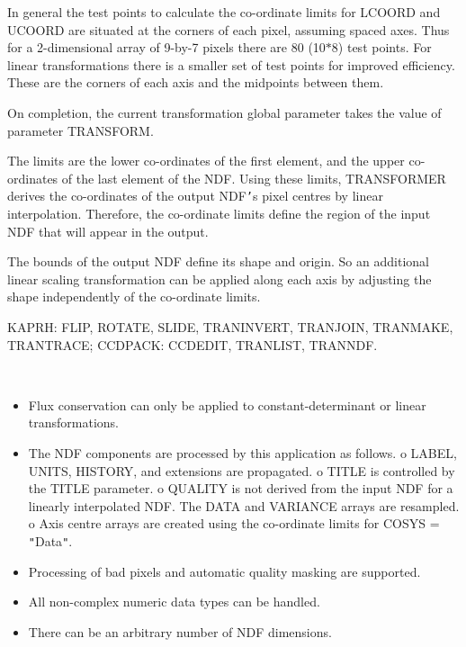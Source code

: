 \documentclass[twoside,11pt]{article}
\newcommand{\sstdiytopic}[2]{\goodbreak \item[{\hspace{-0.35em}#1\hspace{-0.35em}:}] \mbox{} \\[1.3ex] #2}
\newcommand{\sstimplementationstatus}[1]{
   \pagebreak[3] \item[{Implementation Status:}] \mbox{} \\[1.3ex] #1}
\newenvironment{sstitemize}{%
  \vspace{-4.3ex}\begin{itemize}}{\end{itemize}}
\newcommand{\sstitemlist}[1]{
  \mbox{} \\
  \vspace{-3.5ex}
  \begin{sstitemize}
     #1
  \end{sstitemize}
}
\newcommand{\sstitem}{\item}
\renewcommand{\sstdiytopic}[2]{\item[{#1}]
      \begin{description}
         #2
      \end{description}
   }
\renewcommand{\sstimplementationstatus}[1]{\item[Implementation Status:] 
      \begin{description}
         #1
      \end{description}
   }
\newcommand{\sstitemlist}[1]{
      \begin{itemize}
         #1
      \end{itemize}
   }
\begin{document}
{{{         \sstitem
         In general the test points to calculate the co-ordinate limits
         for LCOORD and UCOORD are situated at the corners of each pixel,
         assuming spaced axes.  Thus for a 2-dimensional array of 9-by-7
         pixels there are 80 (10$*$8) test points.  For linear
         transformations there is a smaller set of test points for
         improved efficiency.  These are the corners of each axis and the
         midpoints between them.

         \sstitem
         On completion, the current transformation global parameter
         takes the value of parameter TRANSFORM.
      }
   }
   \sstdiytopic{
      Co-ordinate Limits and Bounds
   }{
      The limits are the lower co-ordinates of the first element, and
      the upper co-ordinates of the last element of the NDF.  Using
      these limits, TRANSFORMER derives the co-ordinates of the output
      NDF{\tt '}s pixel centres by linear interpolation.  Therefore, the
      co-ordinate limits define the region of the input NDF that will
      appear in the output.

      The bounds of the output NDF define its shape and origin.  So
      an additional linear scaling transformation can be applied along
      each axis by adjusting the shape independently of the co-ordinate
      limits.
   }
   \sstdiytopic{
      Related Applications
   }{
      KAPRH: FLIP, ROTATE, SLIDE, TRANINVERT, TRANJOIN, TRANMAKE,
      TRANTRACE; CCDPACK: CCDEDIT, TRANLIST, TRANNDF.
   }
   \sstimplementationstatus{
      \sstitemlist{

         \sstitem
         Flux conservation can only be applied to constant-determinant
         or linear transformations.

         \sstitem
         The NDF components are processed by this application as
         follows.
            o  LABEL, UNITS, HISTORY, and extensions are propagated.
            o  TITLE is controlled by the TITLE parameter.
            o  QUALITY is not derived from the input NDF for a linearly
            interpolated NDF.  The DATA and VARIANCE arrays are resampled.
            o  Axis centre arrays are created using the co-ordinate
            limits for COSYS = {\tt "}Data{\tt "}.

         \sstitem
         Processing of bad pixels and automatic quality masking are
         supported.

         \sstitem
         All non-complex numeric data types can be handled.

         \sstitem
         There can be an arbitrary number of NDF dimensions.
      }
   }
}
\end{document}
